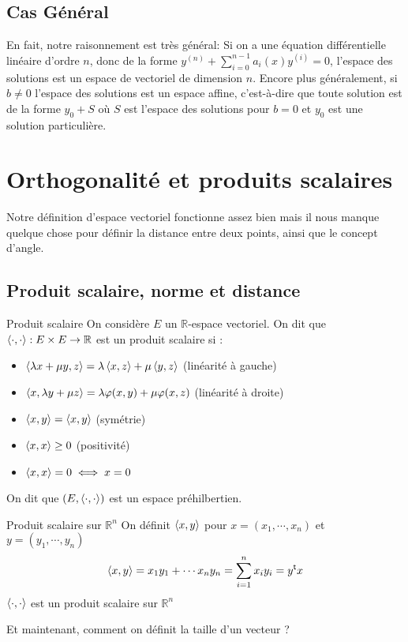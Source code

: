 \documentclass{classe}
\begin{document}
\subsection{Cas Général}
En fait, notre raisonnement est très général:
Si on a une équation différentielle linéaire d'ordre $n$, donc de la forme $y^{(n)} + \sum_{i = 0}^{n - 1} a_{i}(x)y^{(i)} = 0$, l'espace des solutions est un espace de vectoriel de dimension $n$.
Encore plus généralement, si $b \neq 0$ l'espace des solutions est un espace affine, c'est-à-dire que toute solution est de la forme $y_{0} + S$ où $S$ est l'espace des solutions pour $b = 0$ et $y_{0}$ est une solution particulière.

\section{Orthogonalité et produits scalaires}

Notre définition d'espace vectoriel fonctionne assez bien mais il nous manque quelque chose pour définir la distance entre deux points, ainsi que le concept d'angle.

\subsection{Produit scalaire, norme et distance}

\begin{définition}{Produit scalaire}{}
	On considère $E$ un $\mathbb{R}$-espace vectoriel. On dit que $\left\langle \cdot, \cdot \right\rangle : E\times E \rightarrow \mathbb{R}$ est un produit scalaire si :
\begin{itemize}
	\item $\left\langle \lambda x + \mu y, z \right\rangle = \lambda\left\langle x, z \right\rangle + \mu\left\langle y, z \right\rangle$ (linéarité à gauche)
	\item $\left\langle x, \lambda y +\mu z \right\rangle = \lambda\varphi(x, y) + \mu\varphi(x, z)$ (linéarité à droite)
	\item $\left\langle x, y \right\rangle = \left\langle x, y \right\rangle$ (symétrie)
	\item $\left\langle x, x \right\rangle \geq 0$ (positivité)
	\item $\left\langle x, x \right\rangle = 0 \iff x = 0$
\end{itemize}
	On dit que $(E, \left\langle \cdot, \cdot \right\rangle)$ est un espace préhilbertien.
\end{définition}

\begin{propositionfr}{Produit scalaire sur $\mathbb{R}^n$}{}
	On définit $\left\langle x, y \right\rangle$ pour $x=(x_1, \cdots, x_n)$ et $y= (y_1, \cdots, y_n)$
	\begin{equation*}
		\left\langle x, y \right\rangle = x_1y_1 + \cdots x_ny_n = \sum_{i = 1}^{n} x_{i}y_{i} = y{^{\mathsf{t}}}x
	\end{equation*}
	$\left\langle \cdot, \cdot \right\rangle$ est un produit scalaire sur $\mathbb{R}^n$
\end{propositionfr}
Et maintenant, comment on définit la taille d'un vecteur ?
\end{document}
